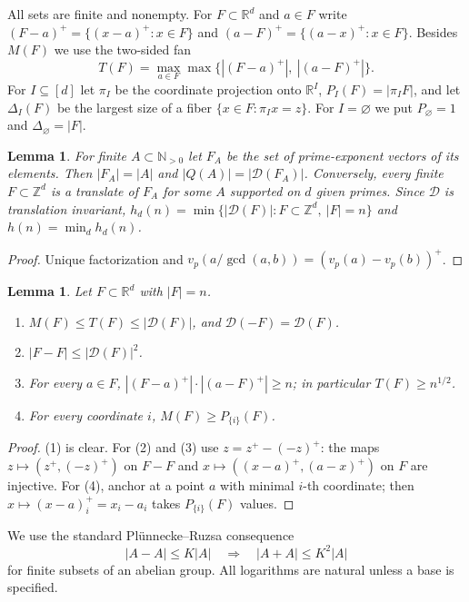 \documentclass[11pt]{amsart}
\newtheorem{lemma}[theorem]{Lemma}
\theoremstyle{definition}
\theoremstyle{remark}
\newcommand{\R}{\mathbb{R}}
\newcommand{\Z}{\mathbb{Z}}
\newcommand{\N}{\mathbb{N}}
\newcommand{\Dp}{\mathcal{D}}
\newcommand{\Mf}{M}
\newcommand{\Tf}{T}
\begin{document}
All sets are finite and nonempty. For $F\subset\R^d$ and $a\in F$ write $(F-a)^+=\{(x-a)^+:x\in F\}$ and $(a-F)^+=\{(a-x)^+:x\in F\}$. Besides $\Mf(F)$ we use the two-sided fan
\[
\Tf(F)=\max_{a\in F}\max\big\{|(F-a)^+|,\ |(a-F)^+|\big\}.
\]
For $I\subseteq[d]$ let $\pi_I$ be the coordinate projection onto $\R^I$, $P_I(F)=|\pi_IF|$, and let $\Delta_I(F)$ be the largest size of a fiber $\{x\in F:\pi_Ix=z\}$. For $I=\varnothing$ we put $P_\varnothing=1$ and $\Delta_\varnothing=|F|$.

\begin{lemma}\label{lem:dictionary}
For finite $A\subset\N_{>0}$ let $F_A$ be the set of prime-exponent vectors of its elements. Then $|F_A|=|A|$ and $|Q(A)|=|\Dp(F_A)|$. Conversely, every finite $F\subset\Z^d$ is a translate of $F_A$ for some $A$ supported on $d$ given primes. Since $\Dp$ is translation invariant, $h_d(n)=\min\{|\Dp(F)|:F\subset\Z^d,\ |F|=n\}$ and $h(n)=\min_d h_d(n)$.
\end{lemma}

\begin{proof}
Unique factorization and $v_p(a/\gcd(a,b))=(v_p(a)-v_p(b))^+$.
\end{proof}

\begin{lemma}\label{lem:basic}
Let $F\subset\R^d$ with $|F|=n$.
\begin{enumerate}
\item $\Mf(F)\le\Tf(F)\le|\Dp(F)|$, and $\Dp(-F)=\Dp(F)$.
\item $|F-F|\le|\Dp(F)|^2$.
\item For every $a\in F$, $|(F-a)^+|\cdot|(a-F)^+|\ge n$; in particular $\Tf(F)\ge n^{1/2}$.
\item For every coordinate $i$, $\Mf(F)\ge P_{\{i\}}(F)$.
\end{enumerate}
\end{lemma}

\begin{proof}
(1) is clear. For (2) and (3) use $z=z^+-(-z)^+$: the maps $z\mapsto(z^+,(-z)^+)$ on $F-F$ and $x\mapsto((x-a)^+,(a-x)^+)$ on $F$ are injective. For (4), anchor at a point $a$ with minimal $i$-th coordinate; then $x\mapsto (x-a)^+_i=x_i-a_i$ takes $P_{\{i\}}(F)$ values.
\end{proof}

We use the standard Pl\"unnecke--Ruzsa consequence \cite{Ru89,Pe12}
\begin{equation}\label{eq:plunnecke}
|A-A|\le K|A|\quad\Longrightarrow\quad |A+A|\le K^2|A|
\end{equation}
for finite subsets of an abelian group. All logarithms are natural unless a base is specified.
\end{document}
